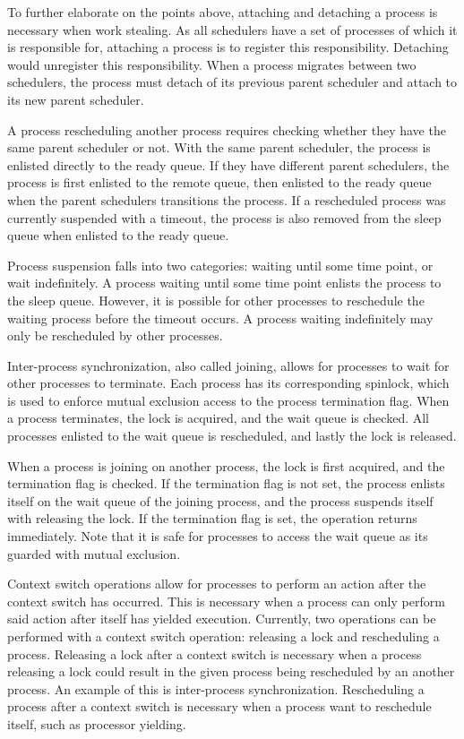 To further elaborate on the points above, attaching and detaching a process is necessary when work stealing. As all schedulers have a set of processes of which it is responsible for, attaching a process is to register this responsibility. Detaching would unregister this responsibility. When a process migrates between two schedulers, the process must detach of its previous parent scheduler and attach to its new parent scheduler. 

A process rescheduling another process requires checking whether they have the same parent scheduler or not. With the same parent scheduler, the process is enlisted directly to the ready queue. If they have different parent schedulers, the process is first enlisted to the remote queue, then enlisted to the ready queue when the parent schedulers transitions the process. If a rescheduled process was currently suspended with a timeout, the process is also removed from the sleep queue when enlisted to the ready queue.

Process suspension falls into two categories: waiting until some time point, or wait indefinitely. A process waiting until some time point enlists the process to the sleep queue. However, it is possible for other processes to reschedule the waiting process before the timeout occurs. A process waiting indefinitely may only be rescheduled by other processes.

Inter\hyp{}process synchronization, also called joining, allows for processes to wait for other processes to terminate. Each process has its corresponding spinlock, which is used to enforce mutual exclusion access to the process termination flag. When a process terminates, the lock is acquired, and the wait queue is checked. All processes enlisted to the wait queue is rescheduled, and lastly the lock is released. 

When a process is joining on another process, the lock is first acquired, and the termination flag is checked. If the termination flag is not set, the process enlists itself on the wait queue of the joining process, and the process suspends itself with releasing the lock. If the termination flag is set, the operation returns immediately. Note that it is safe for processes to access the wait queue as its guarded with mutual exclusion.

Context switch operations allow for processes to perform an action after the context switch has occurred. This is necessary when a process can only perform said action after itself has yielded execution. Currently, two operations can be performed with a context switch operation: releasing a lock and rescheduling a process. Releasing a lock after a context switch is necessary when a process releasing a lock could result in the given process being rescheduled by an another process. An example of this is inter\hyp{}process synchronization. Rescheduling a process after a context switch is necessary when a process want to reschedule itself, such as processor yielding.


